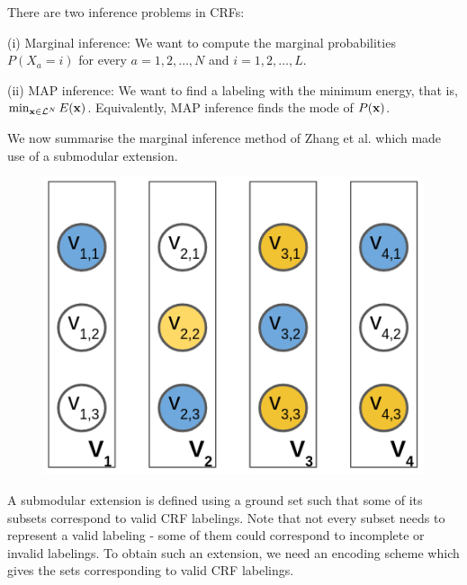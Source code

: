  There are two inference problems in CRFs: 

(i) Marginal inference: We want to compute the marginal probabilities $P(X_a = i)$ for every $a = 1, 2, \dots, N$ and $i = 1, 2, \dots, L$.

(ii) MAP inference: We want to find a labeling with the minimum energy, that is, $\min_{{\bf x} \in {\mathcal L}^N} E({\bf x})$. Equivalently, MAP inference finds the mode of $P({\bf x})$.

\label{sec:review}
We now summarise the marginal inference method of Zhang et al. \citep{zhang2015higher} which
made use of a submodular extension.

\begin{figure}
\centering
\includegraphics[scale = 0.35]{./figures/1_of_L.png}
\label{fig:encoding}
\end{figure}

 A submodular extension is defined using
a ground set such that some of its subsets correspond to valid CRF labelings.
Note that not every subset needs to represent a valid labeling - some of them could
correspond to incomplete or invalid labelings. To obtain such an extension, we need an encoding scheme which gives the sets corresponding to valid CRF labelings. 

